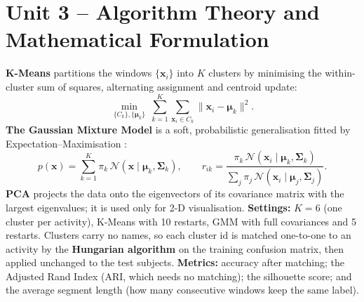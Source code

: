 \section{Unit 3 – Algorithm Theory and Mathematical Formulation}
\textbf{K-Means} \cite{lloyd} partitions the windows $\{\mathbf x_i\}$ into $K$ clusters by minimising the within-cluster sum of
squares, alternating assignment and centroid update:
\begin{equation}
\min_{\{C_k\},\{\boldsymbol\mu_k\}}\ \sum_{k=1}^{K}\sum_{\mathbf x_i\in C_k}\lVert\mathbf x_i-\boldsymbol\mu_k\rVert^2 .
\end{equation}
\textbf{The Gaussian Mixture Model} is a soft, probabilistic generalisation fitted by Expectation–Maximisation \cite{dempster}:
\begin{equation}
p(\mathbf x)=\sum_{k=1}^{K}\pi_k\,\mathcal N(\mathbf x\mid\boldsymbol\mu_k,\boldsymbol\Sigma_k),\qquad
r_{ik}=\frac{\pi_k\,\mathcal N(\mathbf x_i\mid\boldsymbol\mu_k,\boldsymbol\Sigma_k)}{\sum_j\pi_j\,\mathcal N(\mathbf x_i\mid\boldsymbol\mu_j,\boldsymbol\Sigma_j)} .
\end{equation}
\textbf{PCA} projects the data onto the eigenvectors of its covariance matrix with the largest eigenvalues; it is used
only for 2-D visualisation. \textbf{Settings:} $K=6$ (one cluster per activity), K-Means with 10 restarts, GMM with full
covariances and 5 restarts. Clusters carry no names, so each cluster id is matched one-to-one to an activity by the
\textbf{Hungarian algorithm} \cite{kuhn} on the training confusion matrix, then applied unchanged to the test subjects.
\textbf{Metrics:} accuracy after matching; the Adjusted Rand Index (ARI, which needs no matching); the silhouette score;
and the average segment length (how many consecutive windows keep the same label).

